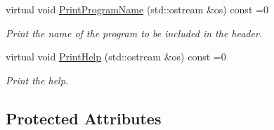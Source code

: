\begin{DoxyCompactItemize}
virtual void \hyperlink{classParameter_afe71fca464da99b2ff720d3ad15df051}{Print\+Program\+Name} (std\+::ostream \&os) const =0
\begin{DoxyCompactList}\small\item\em Print the name of the program to be included in the header. \end{DoxyCompactList}\item 
virtual void \hyperlink{classParameter_a804e04bcbc2eca07deed52e112fa3321}{Print\+Help} (std\+::ostream \&os) const =0
\begin{DoxyCompactList}\small\item\em Print the help. \end{DoxyCompactList}\end{DoxyCompactItemize}
\subsection*{Protected Attributes}
